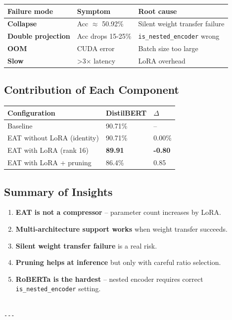 \begin{table}[H]
\centering
\small
\begin{tabular}{lll}
\toprule
\textbf{Failure mode} & \textbf{Symptom} & \textbf{Root cause} \\
\midrule
\textbf{Collapse} & Acc $\approx$ 50.92\% & Silent weight transfer failure \\
\textbf{Double projection} & Acc drops 15-25\% & \texttt{is\_nested\_encoder} wrong \\
\textbf{OOM} & CUDA error & Batch size too large \\
\textbf{Slow} & \textgreater{}3$\times$ latency & LoRA overhead \\
\bottomrule
\end{tabular}
\end{table}

\subsection{Contribution of Each Component}

\begin{table}[H]
\centering
\small
\begin{tabular}{lll}
\toprule
\textbf{Configuration} & \textbf{DistilBERT} & \textbf{$\Delta$} \\
\midrule
Baseline & 90.71\% & -- \\
EAT without LoRA (identity) & 90.71\% & 0.00\% \\
EAT with LoRA (rank 16) & \textbf{89.91} & \textbf{-0.80} \\
EAT with LoRA + pruning & 86.4\% & 0.85 \\
\bottomrule
\end{tabular}
\end{table}

\subsection{Summary of Insights}

\begin{enumerate}
\item \textbf{EAT is not a compressor} -- parameter count increases by LoRA.
\item \textbf{Multi-architecture support works} when weight transfer succeeds.
\item \textbf{Silent weight transfer failure} is a real risk.
\item \textbf{Pruning helps at inference} but only with careful ratio selection.
\item \textbf{RoBERTa is the hardest} -- nested encoder requires correct
  \texttt{is\_nested\_encoder} setting.
\end{enumerate}
\begin{lstlisting}

---
\end{lstlisting}

